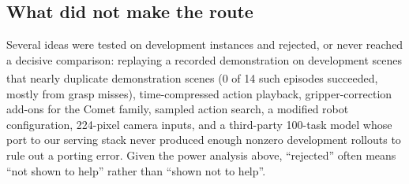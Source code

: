 \documentclass[10pt]{article}
\newcommand{\pl}{\textsuperscript{\dag}}
\begin{document}
\subsection{What did not make the route}
Several ideas were tested on development instances and rejected, or never reached a decisive comparison: replaying a recorded demonstration on development scenes that nearly duplicate demonstration scenes (0 of 14\pl{} such episodes succeeded, mostly from grasp misses), time-compressed action playback, gripper-correction add-ons for the Comet family, sampled action search, a modified robot configuration, 224-pixel camera inputs, and a third-party 100-task model whose port to our serving stack never produced enough nonzero development rollouts to rule out a porting error. Given the power analysis above, ``rejected'' often means ``not shown to help'' rather than ``shown not to help''.
\end{document}

